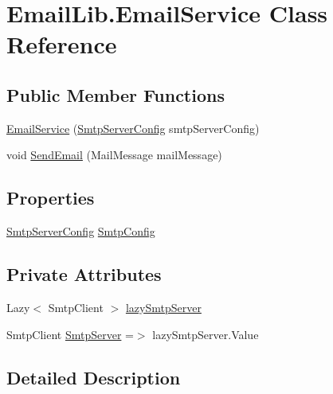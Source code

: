 \hypertarget{classEmailLib_1_1EmailService}{}\section{Email\+Lib.\+Email\+Service Class Reference}
\label{classEmailLib_1_1EmailService}
\subsection*{Public Member Functions}
\begin{DoxyCompactItemize}
\item 
\mbox{\hyperlink{classEmailLib_1_1EmailService_a596b152428b762b746230594ed280b96}{Email\+Service}} (\mbox{\hyperlink{classEmailLib_1_1SmtpServerConfig}{Smtp\+Server\+Config}} smtp\+Server\+Config)
\item 
void \mbox{\hyperlink{classEmailLib_1_1EmailService_a5754177186440d4f6e2053e6c4632c4d}{Send\+Email}} (Mail\+Message mail\+Message)
\end{DoxyCompactItemize}
\subsection*{Properties}
\begin{DoxyCompactItemize}
\item 
\mbox{\hyperlink{classEmailLib_1_1SmtpServerConfig}{Smtp\+Server\+Config}} \mbox{\hyperlink{classEmailLib_1_1EmailService_ac05e7fcbe2f78c347549d5b01b233dc1}{Smtp\+Config}}
\end{DoxyCompactItemize}
\subsection*{Private Attributes}
\begin{DoxyCompactItemize}
\item 
Lazy$<$ Smtp\+Client $>$ \mbox{\hyperlink{classEmailLib_1_1EmailService_a439ba3a6a6edaa1a9a98170538712620}{lazy\+Smtp\+Server}}
\item 
Smtp\+Client \mbox{\hyperlink{classEmailLib_1_1EmailService_af9376cfdd3da9365e40a48a4b2f5608e}{Smtp\+Server}} =$>$ lazy\+Smtp\+Server.\+Value
\end{DoxyCompactItemize}


\subsection{Detailed Description}


